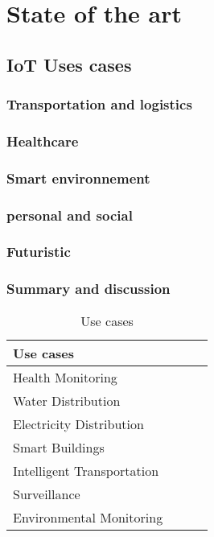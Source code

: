 
\chapter{State of the art \cite{bregell_hardware_2015}} %


\section{IoT Uses cases} %
\label{sec:section_name}

\subsection{Transportation and logistics}
\subsection{Healthcare}
\subsection{Smart environnement}
\subsection{personal and social}
\subsection{Futuristic}
\subsection{Summary and discussion}








\begin{table}[h!]
\scriptsize
	\begin{tabular}{l|l|l|l}
	\textbf{Use cases}         &  &  & \\\hline
	Health Monitoring          &  &  & \\\hline
	Water Distribution         &  &  & \\\hline
	Electricity Distribution   &  &  & \\\hline
	Smart Buildings            &  &  & \\\hline
	Intelligent Transportation &  &  & \\\hline
	Surveillance               &  &  & \\\hline
	Environmental Monitoring   &  &  & \\
	\end{tabular}
	\caption{\label{tab:IoTUseCase} Use cases \cite{hancke_role_2012}}
\end{table}


